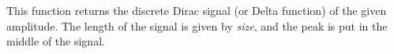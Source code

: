 This function returns the discrete Dirac signal (or Delta function) 
of the given amplitude. The length of the signal is given by {\em size},
and the peak is put in the middle of the signal.





